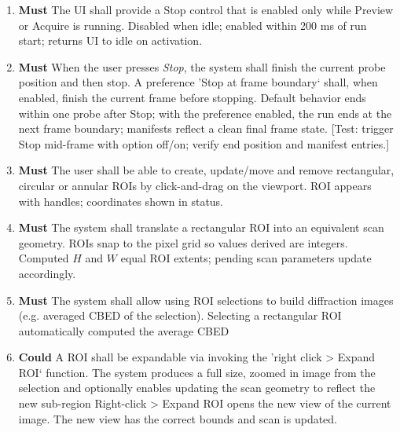 \documentclass[12pt]{article}
\newcommand{\PriorityTag}[2]{%
  \colorbox{#2!25}{\footnotesize\textsf{\textbf{#1}}}\hspace{0.6em}}
\newcommand{\must}{\leavevmode\PriorityTag{Must}{green}}
\newcommand{\could}{\leavevmode\PriorityTag{Could}{cyan}}
\newcounter{reqgrp}[section] %
\newcounter{reqno}
\newcommand{\reqprefix}{GEN}
\newenvironment{requirements}[1]{%
  \renewcommand{\reqprefix}{#1}%
  \refstepcounter{reqgrp}%
  \setcounter{reqno}{0}%
  \begin{enumerate}[leftmargin=*]
}{\end{enumerate}}
\begin{document}
\begin{requirements}{UI}
\item \must {}
  {The UI shall provide a Stop control that is enabled only while Preview or Acquire is running.}
  {Disabled when idle; enabled within 200 ms of run start; returns UI to idle on activation.}

\item \must {}
  {When the user presses \emph{Stop}, the system shall finish the current probe position and then stop. A preference 'Stop at frame boundary` shall, when enabled, finish the current frame before stopping.}
  {Default behavior ends within one probe after Stop; with the preference enabled, the run ends at the next frame boundary; manifests reflect a clean final frame state.}
  [Test: trigger Stop mid-frame with option off/on; verify end position and manifest entries.]


\item \label{req:ui:roi} \must {}
  {The user shall be able to create, update/move and remove rectangular, circular or annular ROIs by click-and-drag on the viewport.}
  {ROI appears with handles; coordinates shown in status.}

\item \must {}
  {The system shall translate a rectangular ROI into an equivalent scan geometry. ROIs snap to the pixel grid so values derived are integers.}
  {Computed \(H\) and \(W\) equal ROI extents; pending scan parameters update accordingly.}

\item \must {}
  {The system shall allow using ROI selections to build diffraction images (e.g. averaged CBED of the selection).}
  {Selecting a rectangular ROI automatically computed the average CBED}

\item \could {}
  {A ROI shall be expandable via invoking the 'right click > Expand ROI` function. The system produces a full size, zoomed in image from the selection and optionally enables updating the scan geometry to reflect the new sub-region}
  {Right-click > Expand ROI opens the new view of the current image. The new view has the correct bounds and scan is updated.}


\end{requirements}
\end{document}
